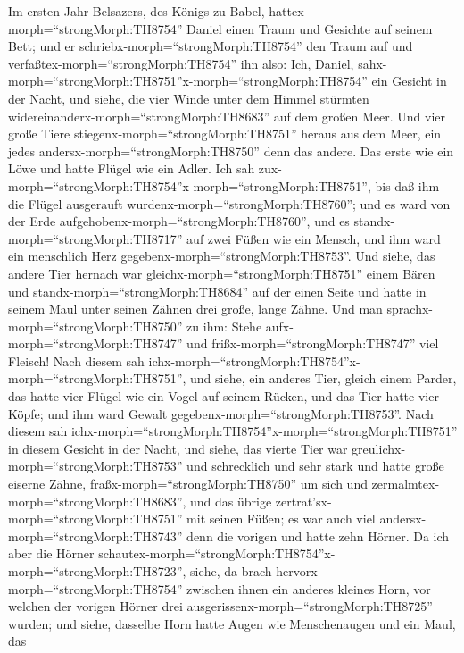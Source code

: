  Im ersten Jahr Belsazers, des Königs zu Babel,
hattex-morph=``strongMorph:TH8754'' Daniel einen Traum und Gesichte auf
seinem Bett; und er schriebx-morph=``strongMorph:TH8754'' den Traum auf
und verfaßtex-morph=``strongMorph:TH8754'' ihn also:  Ich,
Daniel, sahx-morph=``strongMorph:TH8751''x-morph=``strongMorph:TH8754''
ein Gesicht in der Nacht, und siehe, die vier Winde unter dem Himmel
stürmten widereinanderx-morph=``strongMorph:TH8683'' auf dem großen
Meer.  Und vier große Tiere
stiegenx-morph=``strongMorph:TH8751'' heraus aus dem Meer, ein jedes
andersx-morph=``strongMorph:TH8750'' denn das andere.  Das
erste wie ein Löwe und hatte Flügel wie ein Adler. Ich sah
zux-morph=``strongMorph:TH8754''x-morph=``strongMorph:TH8751'', bis daß
ihm die Flügel ausgerauft wurdenx-morph=``strongMorph:TH8760''; und es
ward von der Erde aufgehobenx-morph=``strongMorph:TH8760'', und es
standx-morph=``strongMorph:TH8717'' auf zwei Füßen wie ein Mensch, und
ihm ward ein menschlich Herz gegebenx-morph=``strongMorph:TH8753''.
 Und siehe, das andere Tier hernach war
gleichx-morph=``strongMorph:TH8751'' einem Bären und
standx-morph=``strongMorph:TH8684'' auf der einen Seite und hatte in
seinem Maul unter seinen Zähnen drei große, lange Zähne. Und man
sprachx-morph=``strongMorph:TH8750'' zu ihm: Stehe
aufx-morph=``strongMorph:TH8747'' und frißx-morph=``strongMorph:TH8747''
viel Fleisch!  Nach diesem sah
ichx-morph=``strongMorph:TH8754''x-morph=``strongMorph:TH8751'', und
siehe, ein anderes Tier, gleich einem Parder, das hatte vier Flügel wie
ein Vogel auf seinem Rücken, und das Tier hatte vier Köpfe; und ihm ward
Gewalt gegebenx-morph=``strongMorph:TH8753''.  Nach diesem
sah ichx-morph=``strongMorph:TH8754''x-morph=``strongMorph:TH8751'' in
diesem Gesicht in der Nacht, und siehe, das vierte Tier war
greulichx-morph=``strongMorph:TH8753'' und schrecklich und sehr stark
und hatte große eiserne Zähne, fraßx-morph=``strongMorph:TH8750'' um
sich und zermalmtex-morph=``strongMorph:TH8683'', und das übrige
zertrat'sx-morph=``strongMorph:TH8751'' mit seinen Füßen; es war auch
viel andersx-morph=``strongMorph:TH8743'' denn die vorigen und hatte
zehn Hörner.  Da ich aber die Hörner
schautex-morph=``strongMorph:TH8754''x-morph=``strongMorph:TH8723'',
siehe, da brach hervorx-morph=``strongMorph:TH8754'' zwischen ihnen ein
anderes kleines Horn, vor welchen der vorigen Hörner drei
ausgerissenx-morph=``strongMorph:TH8725'' wurden; und siehe, dasselbe
Horn hatte Augen wie Menschenaugen und ein Maul, das
